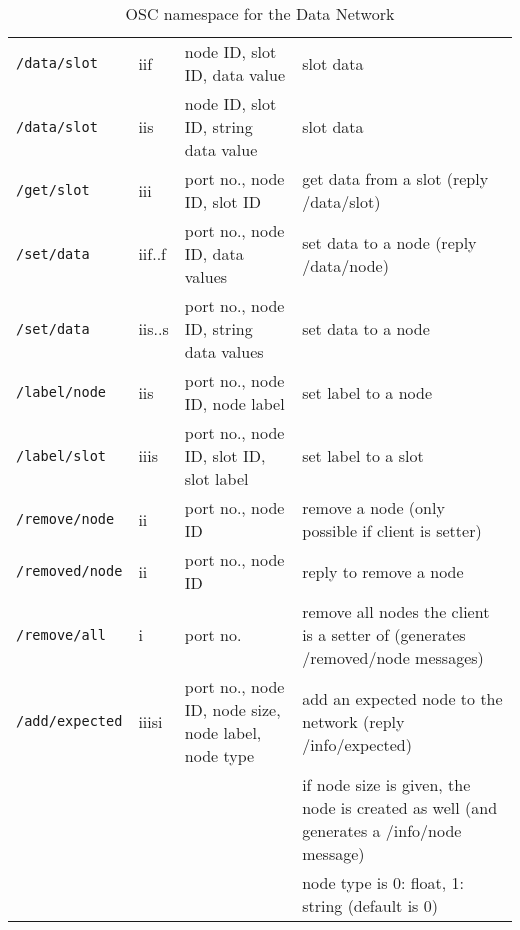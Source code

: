 \documentclass[letterpaper,10pt]{article}
\begin{document}
\begin{sidewaystable}[!tbp]
\begin{center}
\begin{tabular}{|llll|}
\verb|/data/slot| & iif & node ID, slot ID, data value & slot data \\
\verb|/data/slot| & iis & node ID, slot ID, string data value & slot data \\
\verb|/get/slot| & iii & port no., node ID, slot ID & get data from a slot (reply /data/slot) \\

\verb|/set/data| & iif..f & port no., node ID, data values & set data to a node (reply /data/node)\\
\verb|/set/data| & iis..s & port no., node ID, string data values & set data to a node\\

\verb|/label/node| & iis & port no., node ID, node label & set label to a node \\
\verb|/label/slot| & iiis & port no., node ID, slot ID, slot label & set label to a slot \\

\verb|/remove/node| & ii & port no., node ID & remove a node (only possible if client is setter) \\
\verb|/removed/node| & ii & port no., node ID & reply to remove a node \\
\verb|/remove/all| & i & port no. & remove all nodes the client is a setter of (generates /removed/node messages) \\

\verb|/add/expected| & iiisi & port no., node ID, node size, node label, node type & add an expected node to the network (reply /info/expected) \\
 &  &  & if node size is given, the node is created as well (and generates a /info/node message) \\
 &  &  & node type is 0: float, 1: string (default is 0) \\
\hline
\end{tabular}
\end{center}
\caption{OSC namespace for the Data Network}
\label{oscinterface}
\end{sidewaystable}
\end{document}
